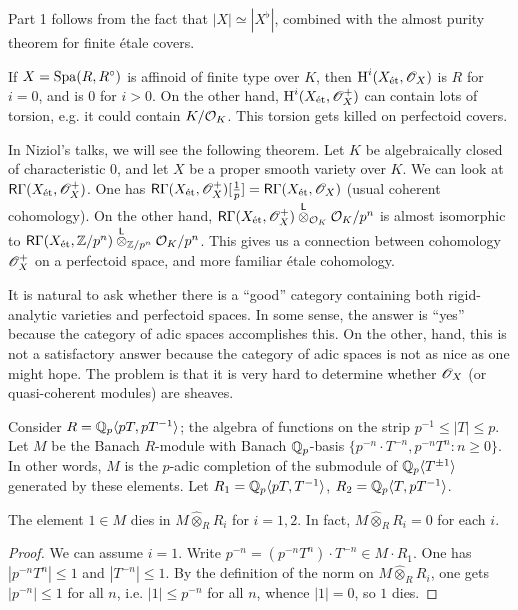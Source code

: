 Part 1 follows from the fact that $|X|\simeq |X^\flat|$, combined with the almost 
purity theorem for finite \'etale covers. 

If $X=\operatorname{Spa}(R,R^\circ)$ is affinoid of finite type over $K$, then 
$\operatorname{H}^i(X_{\textnormal{\'et}},\mathscr{O}_X)$ is $R$ for $i=0$, and is $0$ for $i>0$. On the other hand, 
$\operatorname{H}^i(X_{\textnormal{\'et}},\mathscr{O}_X^+)$ can contain lots of torsion, e.g. it could contain 
$K/ \mathcal{O}_K$. This torsion gets killed on perfectoid covers. 

In Niziol's talks, we will see the following theorem. Let $K$ be algebraically 
closed of characteristic $0$, and let $X$ be a proper smooth variety over $K$. 
We can look at $\mathsf R\Gamma(X_{\textnormal{\'et}},\mathscr{O}_X^+)$. One has 
$\mathsf R\Gamma(X_{\textnormal{\'et}},\mathscr{O}_X^+)[\frac 1 p] = \mathsf R\Gamma(X_{\textnormal{\'et}},\mathscr{O}_X)$ 
(usual coherent cohomology). On the other hand, 
$\mathsf R\Gamma(X_{\textnormal{\'et}},\mathscr{O}_X^+)\overset{\mathsf L}{\otimes}_{\mathcal{O}_K} \mathcal{O}_K/p^n$ is almost 
isomorphic to $\mathsf R\Gamma(X_{\textnormal{\'et}},\mathbb{Z}/p^n)\overset{\mathsf L}{\otimes}_{\mathbb{Z}/p^n} \mathcal{O}_K / p^n$. 
This gives us a connection between cohomology $\mathscr{O}_X^+$ on a perfectoid 
space, and more familiar \'etale cohomology. 

It is natural to ask whether there is a ``good'' category containing both 
rigid-analytic varieties and perfectoid spaces. In some sense, the answer is 
``yes'' because the category of adic spaces accomplishes this. On the other, 
hand, this is not a satisfactory answer because the category of adic spaces is 
not as nice as one might hope. The problem is that it is very hard to determine 
whether $\mathscr{O}_X$ (or quasi-coherent modules) are sheaves.  

\begin{example}
Consider $R=\mathbb{Q}_p\langle p T, p T^{-1}\rangle$; the algebra of functions on the 
strip $p^{-1}\leqslant |T|\leqslant p$. Let $M$ be the Banach $R$-module with 
Banach $\mathbb{Q}_p$-basis $\{p^{-n}\cdot T^{-n}, p^{-n} T^n:n\geqslant 0\}$. In 
other words, $M$ is the $p$-adic completion of the submodule of 
$\mathbb{Q}_p\langle T^{\pm 1}\rangle$ generated by these elements. Let 
$R_1 = \mathbb{Q}_p\langle p T,T^{-1}\rangle$, 
$R_2 = \mathbb{Q}_p\langle T,p T^{-1}\rangle$. 
\end{example}

\begin{proposition}
The element $1\in M$ dies in $M\widehat\otimes_R R_i$ for $i=1,2$. In fact, 
$M\widehat\otimes_R R_i = 0$ for each $i$. 
\end{proposition}
\begin{proof}
We can assume $i=1$. Write $p^{-n} = (p^{-n} T^n)\cdot T^{-n} \in M\cdot R_1$. 
One has $|p^{-n} T^n|\leqslant 1$ and $|T^{-n}|\leqslant 1$. By the definition of 
the norm on $M\widehat\otimes_R R_i$, one gets 
$|p^{-n}|\leqslant 1$ for all $n$, i.e. 
$|1|\leqslant p^{-n}$ for all $n$, whence $|1|=0$, so $1$ dies. 
\end{proof}

